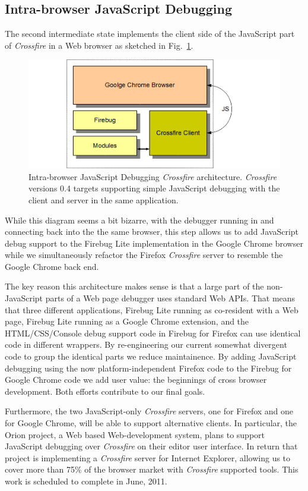 \subsection{Intra-browser JavaScript Debugging}
The second intermediate state implements the client side of the JavaScript part
of \textit{Crossfire} in a Web browser as sketched in Fig.~\ref{fig:fbugChrome}.
\begin{figure}[htp]
  \includegraphics  [width = 86 mm] {figures/fbugChrome.png}
  \caption{Intra-browser JavaScript Debugging \textit{Crossfire} architecture.
\textit{Crossfire} versions 0.4 targets supporting simple JavaScript debugging with the client and server in the same application.}
 \label{fig:fbugChrome}
\end{figure}
While this diagram seems a bit bizarre, with the debugger running in and
connecting back into the the same browser, this step allows us to add JavaScript
debug support to the Firebug Lite implementation in the Google Chrome browser
while we simultaneously refactor the Firefox  \textit{Crossfire} server to
resemble the Google Chrome back end.


The key reason this architecture makes sense is that a large part of the
non-JavaScript parts of a Web page debugger uses standard Web APIs. That  means
that three different applications, Firebug Lite running as co-resident with a
Web page, Firebug Lite running as a Google Chrome extension,  and the
HTML/CSS/Console debug support code in Firebug for Firefox can use identical
code in different wrappers. By re-engineering our current somewhat divergent
code to group the identical parts we reduce maintainence. By adding
JavaScript debugging using the now platform-independent Firefox code to the
Firebug for Google Chrome code we add user value: the beginnings of cross
browser development. Both efforts contribute to our final goals.


Furthermore, the two JavaScript-only \textit{Crossfire} servers, one for Firefox
and one for Google Chrome, will be able to support alternative clients. In
particular, the Orion project, a Web based Web-development system, plans to
support JavaScript debugging over \textit{Crossfire} on their editor user
interface. In return that project is implementing a \textit{Crossfire} server
for Internet Explorer, allowing us to cover more than 75\% of the browser market
with \textit{Crossfire} supported tools. This work is scheduled to complete in
June, 2011.


